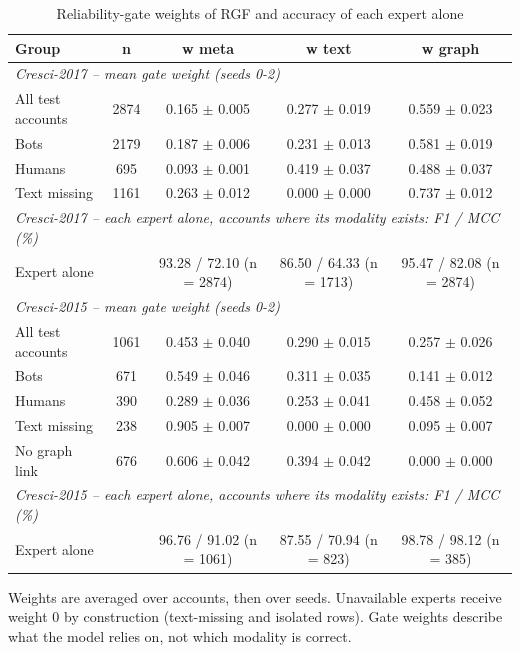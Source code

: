 \begin{table}[!t]
\centering
\caption{Reliability-gate weights of RGF and accuracy of each expert alone}
\label{tab:gate_weights}
\footnotesize
\setlength{\tabcolsep}{3pt}
\begin{tabular}{lcccc}
\hline
\textbf{Group} & \textbf{n} & \textbf{w meta} & \textbf{w text} & \textbf{w graph} \\
\hline
\multicolumn{5}{l}{\textit{Cresci-2017 -- mean gate weight (seeds 0-2)}} \\
All test accounts & 2874 & 0.165 $\pm$ 0.005 & 0.277 $\pm$ 0.019 & 0.559 $\pm$ 0.023 \\
Bots & 2179 & 0.187 $\pm$ 0.006 & 0.231 $\pm$ 0.013 & 0.581 $\pm$ 0.019 \\
Humans & 695 & 0.093 $\pm$ 0.001 & 0.419 $\pm$ 0.037 & 0.488 $\pm$ 0.037 \\
Text missing & 1161 & 0.263 $\pm$ 0.012 & 0.000 $\pm$ 0.000 & 0.737 $\pm$ 0.012 \\
\multicolumn{5}{l}{\textit{Cresci-2017 -- each expert alone, accounts where its modality exists: F1 / MCC (\%)}} \\
Expert alone &  & 93.28 / 72.10 (n = 2874) & 86.50 / 64.33 (n = 1713) & 95.47 / 82.08 (n = 2874) \\
\multicolumn{5}{l}{\textit{Cresci-2015 -- mean gate weight (seeds 0-2)}} \\
All test accounts & 1061 & 0.453 $\pm$ 0.040 & 0.290 $\pm$ 0.015 & 0.257 $\pm$ 0.026 \\
Bots & 671 & 0.549 $\pm$ 0.046 & 0.311 $\pm$ 0.035 & 0.141 $\pm$ 0.012 \\
Humans & 390 & 0.289 $\pm$ 0.036 & 0.253 $\pm$ 0.041 & 0.458 $\pm$ 0.052 \\
Text missing & 238 & 0.905 $\pm$ 0.007 & 0.000 $\pm$ 0.000 & 0.095 $\pm$ 0.007 \\
No graph link & 676 & 0.606 $\pm$ 0.042 & 0.394 $\pm$ 0.042 & 0.000 $\pm$ 0.000 \\
\multicolumn{5}{l}{\textit{Cresci-2015 -- each expert alone, accounts where its modality exists: F1 / MCC (\%)}} \\
Expert alone &  & 96.76 / 91.02 (n = 1061) & 87.55 / 70.94 (n = 823) & 98.78 / 98.12 (n = 385) \\
\hline
\end{tabular}
\par\smallskip\parbox{\linewidth}{\scriptsize Weights are averaged over accounts, then over seeds. Unavailable experts receive weight 0 by construction (text-missing and isolated rows). Gate weights describe what the model relies on, not which modality is correct.}
\end{table}

